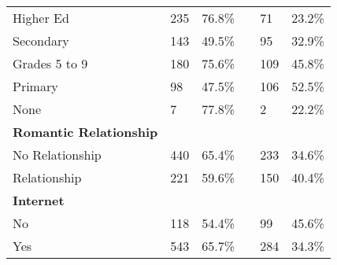 \documentclass[sigconf]{acmart}
\begin{document}
\begin{table}
\begin{tabular}{llllll}
    Higher Ed     & 235 & 76.8\% & &  71 & 23.2\% \\
    Secondary     & 143 & 49.5\% & &  95 & 32.9\% \\
    Grades 5 to 9 & 180 & 75.6\% & & 109 & 45.8\% \\
    Primary       &  98 & 47.5\% & & 106 & 52.5\% \\
    None          &   7 & 77.8\% & &   2 & 22.2\% \\
    \midrule    
    \textbf{Romantic Relationship} &  &  &  &  & \\
    No Relationship & 440 & 65.4\% & & 233 & 34.6\%  \\
    Relationship    & 221 & 59.6\% & & 150 & 40.4\%  \\    
    \midrule
    \textbf{Internet} &  &  &  &  & \\
    No        & 118 & 54.4\% & &  99 & 45.6\%  \\
    Yes        & 543 & 65.7\% & & 284 & 34.3\%  \\
    \bottomrule
  \end{tabular}
\end{table}


\end{document}
